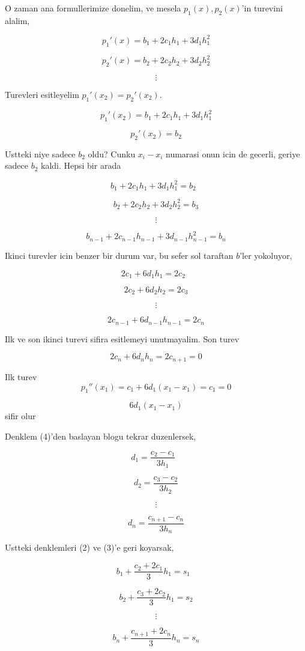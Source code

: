 \documentclass[12pt,fleqn]{article}\usepackage{../common}
\begin{document}
O zaman ana formullerimize donelim, ve mesela $p_1(x),p_2(x)$'in turevini
alalim,

$$ p_1'(x) = b_1 + 2c_1h_1 + 3d_1h_1^2 $$

$$ p_2'(x) = b_2 + 2c_2h_2 + 3d_2h_2^2 $$

$$ \vdots $$

Turevleri esitleyelim $p_1'(x_2) = p_2'(x_2)$. 

$$ p_1'(x_2) = b_1 + 2c_1h_1 + 3d_1h_1^2 $$

$$  p_2'(x_2) = b_2 $$

Ustteki niye sadece $b_2$ oldu? Cunku $x_i-x_i$ numarasi onun icin de
gecerli, geriye sadece $b_2$ kaldi. Hepsi bir arada

$$  b_1 + 2c_1h_1 + 3d_1h_1^2  = b_2 \ \ \ \label{3}$$

$$  b_2 + 2c_2h_2 + 3d_2h_2^2 = b_3 $$

$$ \vdots $$

$$  b_{n-1} + 2c_{n-1}h_{n-1} + 3d_{n-1}h_{n-1}^2 =  b_n $$

Ikinci turevler icin benzer bir durum var, bu sefer sol taraftan $b$'ler
yokoluyor, 

$$ 2c_1 + 6d_1h_1 = 2c_2 \ \ \ \label{4} $$

$$ 2c_2 + 6d_2h_2 = 2c_3 $$

$$ \vdots $$

$$ 2c_{n-1} + 6d_{n-1}h_{n-1} = 2c_n $$

Ilk ve son ikinci turevi sifira esitlemeyi unutmayalim. Son turev

$$ 2c_n + 6d_nh_n = 2c_{n+1} = 0 $$

Ilk turev
$$ p_1''(x_1) =  c_1 + 6d_1(x_1-x_1)  = c_1 = 0$$

$$ 6d_1(x_1-x_1) $$ sifir olur

Denklem (4)'den baslayan blogu tekrar duzenlersek, 

$$ d_1 = \frac{ c_2 - c_1}{3h_1} \ \ \ \label{5} $$

$$ d_2 = \frac{ c_3 - c_2}{3h_2} $$

$$ \vdots $$

$$ d_n = \frac{ c_{n+1} - c_n}{3h_n} $$

Ustteki denklemleri (2) ve (3)'e geri koyarsak,

$$ b_1 + \frac{ c_2 + 2c_1}{3}h_1 = s_1 \ \ \ \label{7} $$

$$ b_2 + \frac{ c_3 + 2c_2}{3}h_1 = s_2 $$

$$ \vdots $$

$$ b_n + \frac{ c_{n+1} + 2c_n}{3}h_n = s_n $$
\end{document}
